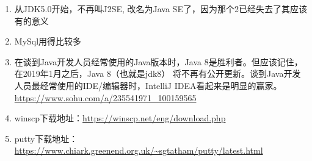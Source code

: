 \documentclass[a4paper, 12pt]{article}
\begin{document}
\begin{enumerate}
\item 从JDK5.0开始，不再叫J2SE, 改名为Java SE了，因为那个2已经失去了其应该有的意义

\item MySql用得比较多

\item 在谈到Java开发人员经常使用的Java版本时，Java 8是胜利者。但应该记住，在2019年1月之后，Java 8（也就是jdk8） 将不再有公开更新。谈到Java开发人员最经常使用的IDE/编辑器时，IntelliJ IDEA看起来是明显的赢家。 \url{https://www.sohu.com/a/235541971_100159565}

\item winscp下载地址：\url{https://winscp.net/eng/download.php}

\item putty下载地址：\url{https://www.chiark.greenend.org.uk/~sgtatham/putty/latest.html}

\end{enumerate}
\end{document}
